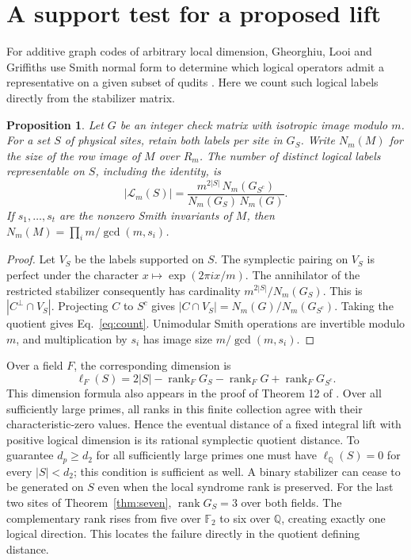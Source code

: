 \documentclass[11pt]{article}
\newtheorem{prop}[theorem]{Proposition}
\newcommand{\F}{\mathbb F}
\newcommand{\Q}{\mathbb Q}
\newcommand{\rank}{\operatorname{rank}}
\begin{document}
\section{A support test for a proposed lift}
For additive graph codes of arbitrary local dimension, Gheorghiu, Looi and Griffiths use Smith normal form to determine which logical operators admit a representative on a given subset of qudits \cite[App.~C]{glg}. Here we count such logical labels directly from the stabilizer matrix.
\begin{prop}\label{prop:count}
Let $G$ be an integer check matrix with isotropic image modulo $m$. For a set $S$ of physical sites, retain both labels per site in $G_S$. Write $N_m(M)$ for the size of the row image of $M$ over $R_m$. The number of distinct logical labels representable on $S$, including the identity, is
\begin{equation}\label{eq:count}
 |\mathcal L_m(S)|=
 \frac{m^{2|S|}\,N_m(G_{S^c})}{N_m(G_S)\,N_m(G)}.
\end{equation}
If $s_1,\ldots,s_t$ are the nonzero Smith invariants of $M$, then $N_m(M)=\prod_i m/\gcd(m,s_i)$.
\end{prop}
\begin{proof}
Let $V_S$ be the labels supported on $S$. The symplectic pairing on $V_S$ is perfect under the character $x\mapsto \exp(2\pi i x/m)$. The annihilator of the restricted stabilizer consequently has cardinality $m^{2|S|}/N_m(G_S)$. This is $|C^\perp\cap V_S|$. Projecting $C$ to $S^c$ gives $|C\cap V_S|=N_m(G)/N_m(G_{S^c})$. Taking the quotient gives Eq.~\eqref{eq:count}. Unimodular Smith operations are invertible modulo $m$, and multiplication by $s_i$ has image size $m/\gcd(m,s_i)$.
\end{proof}
Over a field $F$, the corresponding dimension is
\[
 \ell_F(S)=2|S|-\rank_F G_S-\rank_F G+\rank_F G_{S^c}.
\]
This dimension formula also appears in the proof of Theorem 12 of \cite{ldi26}. Over all sufficiently large primes, all ranks in this finite collection agree with their characteristic-zero values. Hence the eventual distance of a fixed integral lift with positive logical dimension is its rational symplectic quotient distance. To guarantee $d_p\ge d_2$ for all sufficiently large primes one must have $\ell_{\Q}(S)=0$ for every $|S|<d_2$; this condition is sufficient as well. A binary stabilizer can cease to be generated on $S$ even when the local syndrome rank is preserved. For the last two sites of Theorem~\ref{thm:seven}, $\rank G_S=3$ over both fields. The complementary rank rises from five over $\F_2$ to six over $\Q$, creating exactly one logical direction. This locates the failure directly in the quotient defining distance.
\end{document}
